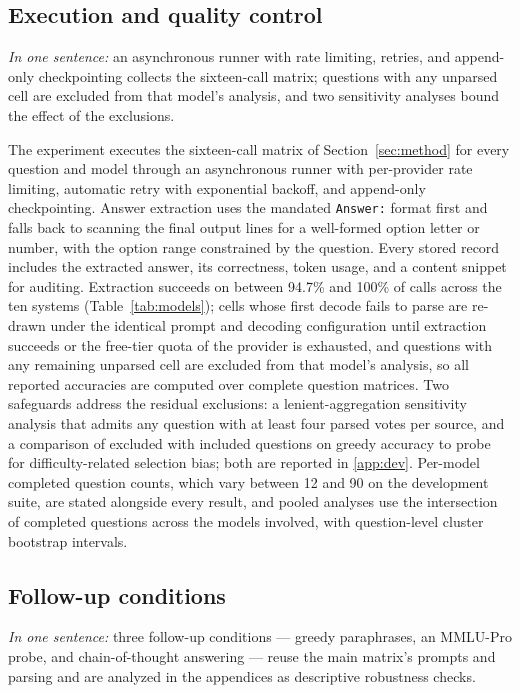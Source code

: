 \subsection{Execution and quality control}

\emph{In one sentence:} an asynchronous runner with rate limiting, retries, and append-only checkpointing collects the sixteen-call matrix; questions with any unparsed cell are excluded from that model's analysis, and two sensitivity analyses bound the effect of the exclusions.

The experiment executes the sixteen-call matrix of Section~\ref{sec:method} for every question and model through an asynchronous runner with per-provider rate limiting, automatic retry with exponential backoff, and append-only checkpointing. Answer extraction uses the mandated \texttt{Answer:} format first and falls back to scanning the final output lines for a well-formed option letter or number, with the option range constrained by the question. Every stored record includes the extracted answer, its correctness, token usage, and a content snippet for auditing. Extraction succeeds on between 94.7\% and 100\% of calls across the ten systems (Table~\ref{tab:models}); cells whose first decode fails to parse are re-drawn under the identical prompt and decoding configuration until extraction succeeds or the free-tier quota of the provider is exhausted, and questions with any remaining unparsed cell are excluded from that model's analysis, so all reported accuracies are computed over complete question matrices. Two safeguards address the residual exclusions: a lenient-aggregation sensitivity analysis that admits any question with at least four parsed votes per source, and a comparison of excluded with included questions on greedy accuracy to probe for difficulty-related selection bias; both are reported in \ref{app:dev}. Per-model completed question counts, which vary between 12 and 90 on the development suite, are stated alongside every result, and pooled analyses use the intersection of completed questions across the models involved, with question-level cluster bootstrap intervals.

\subsection{Follow-up conditions}

\emph{In one sentence:} three follow-up conditions --- greedy paraphrases, an MMLU-Pro probe, and chain-of-thought answering --- reuse the main matrix's prompts and parsing and are analyzed in the appendices as descriptive robustness checks.

